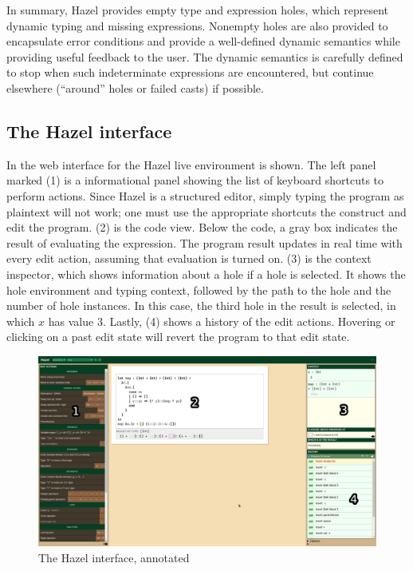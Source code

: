 In summary, Hazel provides empty type and expression holes, which represent dynamic typing and missing expressions. Nonempty holes are also provided to encapsulate error conditions and provide a well-defined dynamic semantics while providing useful feedback to the user. The dynamic semantics is carefully defined to stop when such indeterminate expressions are encountered, but continue elsewhere (``around'' holes or failed casts) if possible.

\subsection{The Hazel interface}
\label{sec:hazel-interface}

In  the web interface for the Hazel live environment is shown. The left panel marked (1) is a informational panel showing the list of keyboard shortcuts to perform actions. Since Hazel is a structured editor, simply typing the program as plaintext will not work; one must use the appropriate shortcuts the construct and edit the program. (2) is the code view. Below the code, a gray box indicates the result of evaluating the expression. The program result updates in real time with every edit action, assuming that evaluation is turned on. (3) is the context inspector, which shows information about a hole if a hole is selected. It shows the hole environment and typing context, followed by the path to the hole and the number of hole instances. In this case, the third hole in the result is selected, in which $x$ has value $3$. Lastly, (4) shows a history of the edit actions. Hovering or clicking on a past edit state will revert the program to that edit state.

\begin{figure}
  \centering
  \includegraphics[width=\linewidth]{img/hazel_ui_annot.png}
  \caption{The Hazel interface, annotated}
  \label{fig:hazel-interface}
\end{figure}

